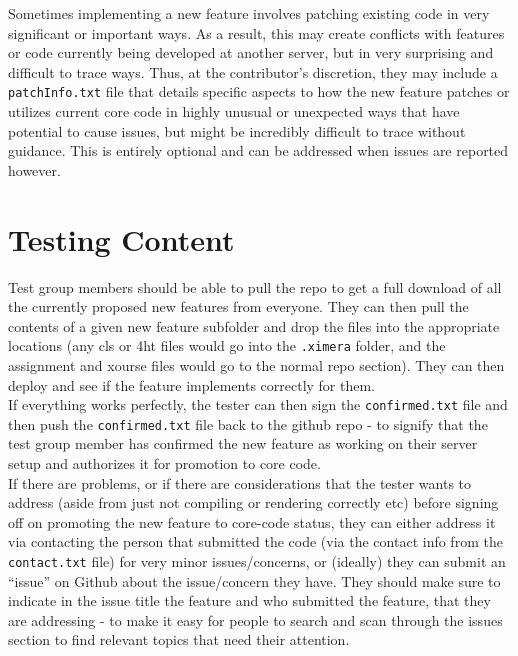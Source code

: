 \documentclass{ximera}
\begin{document}
            Sometimes implementing a new feature involves patching existing code in very significant or important ways. As a result, this may create conflicts with features or code currently being developed at another server, but in very surprising and difficult to trace ways. Thus, at the contributor's discretion, they may include a \verb|patchInfo.txt| file that details specific aspects to how the new feature patches or utilizes current core code in highly unusual or unexpected ways that have potential to cause issues, but might be incredibly difficult to trace without guidance. This is entirely optional and can be addressed when issues are reported however.
            
\section{Testing Content}
    
    Test group members should be able to pull the repo to get a full download of all the currently proposed new features from everyone. They can then pull the contents of a given new feature subfolder and drop the files into the appropriate locations (any cls or 4ht files would go into the \verb|.ximera| folder, and the assignment and xourse files would go to the normal repo section). They can then deploy and see if the feature implements correctly for them. \\
    
    If everything works perfectly, the tester can then sign the \verb|confirmed.txt| file and then push the \verb|confirmed.txt| file back to the github repo - to signify that the test group member has confirmed the new feature as working on their server setup and authorizes it for promotion to core code.\\
    
    If there are problems, or if there are considerations that the tester wants to address (aside from just not compiling or rendering correctly etc) before signing off on promoting the new feature to core-code status, they can either address it via contacting the person that submitted the code (via the contact info from the \verb|contact.txt| file) for very minor issues/concerns, or (ideally) they can submit an ``issue'' on Github about the issue/concern they have. They should make sure to indicate in the issue title the feature and who submitted the feature, that they are addressing - to make it easy for people to search and scan through the issues section to find relevant topics that need their attention.\\
\end{document}
